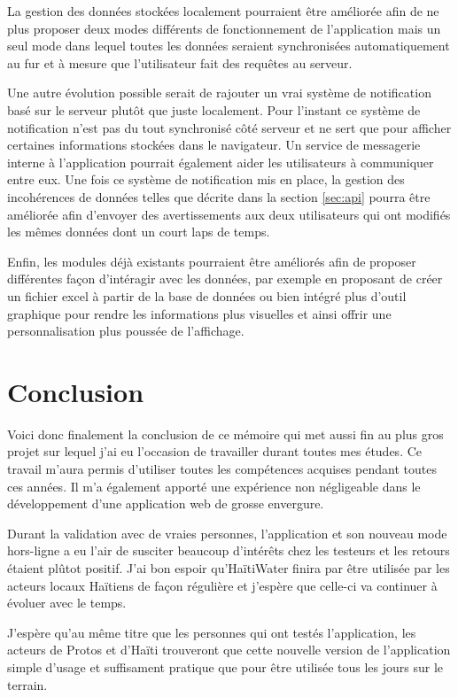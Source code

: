 \documentclass{EPL-master-thesis-covers-FR}
\begin{document}
			La gestion des données stockées localement pourraient être améliorée afin de ne plus proposer deux modes différents de fonctionnement de l'application mais un seul mode dans lequel toutes les données seraient synchronisées automatiquement au fur et à mesure que l'utilisateur fait des requêtes au serveur.
			
			Une autre évolution possible serait de rajouter un vrai système de notification basé sur le serveur plutôt que juste localement. Pour l'instant ce système de notification n'est pas du tout synchronisé côté serveur et ne sert que pour afficher certaines informations stockées dans le navigateur. Un service de messagerie interne à l'application pourrait également aider les utilisateurs à communiquer entre eux. Une fois ce système de notification mis en place, la gestion des incohérences de données telles que décrite dans la section \ref{sec:api} pourra être améliorée afin d'envoyer des avertissements aux deux utilisateurs qui ont modifiés les mêmes données dont un court laps de temps.
		
			Enfin, les modules déjà existants pourraient être améliorés afin de proposer différentes façon d'intéragir avec les données, par exemple en proposant de créer un fichier excel à partir de la base de données ou bien intégré plus d'outil graphique pour rendre les informations plus visuelles et ainsi offrir une personnalisation plus poussée de l'affichage.


			
	\chapter{Conclusion}
		Voici donc finalement la conclusion de ce mémoire qui met aussi fin au plus gros projet sur lequel j'ai eu l'occasion de travailler durant toutes mes études. Ce travail m'aura permis d'utiliser toutes les compétences acquises pendant toutes ces années. Il m'a également apporté une expérience non négligeable dans le développement d'une application web de grosse envergure.
		
		Durant la validation avec de vraies personnes, l'application et son nouveau mode hors-ligne a eu l'air de susciter beaucoup d'intérêts chez les testeurs et les retours étaient plûtot positif. J'ai bon espoir qu'HaïtiWater finira par être utilisée par les acteurs locaux Haïtiens de façon régulière et j'espère que celle-ci va continuer à évoluer avec le temps. 
		
		J'espère qu'au même titre que les personnes qui ont testés l'application, les acteurs de Protos et d'Haïti trouveront que cette nouvelle version de l'application simple d'usage et suffisament pratique que pour être utilisée tous les jours sur le terrain. 

		

	
	
		

	

	\setlength{\parskip}{0em}
	\backcoverpage
\end{document}
